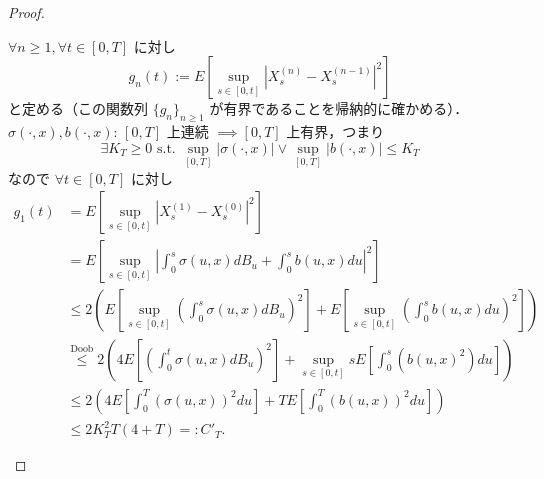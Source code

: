 \documentclass{jsarticle}
\begin{document}
\begin{proof}
\begin{enumerate}[label=(\roman*)]
        $\forall n\ge1, \forall t\in[0, T]$ に対し
        $$
        g_n(t)
        := E[\sup_{s\in[0, t]}\left\lvert X_s^{(n)}-X_s^{(n-1)}\right\rvert^2]
        $$
        と定める（この関数列 $\{g_n\}_{n\ge1}$ が有界であることを帰納的に確かめる）．
        $\sigma(\cdot, x), b(\cdot, x)$: $[0, T]$ 上連続 $\implies [0, T]$ 上有界，つまり
        $$
        \exists K_T\ge0\text{ s.t. }\sup_{[0, T]}\left\lvert \sigma(\cdot, x)\right\rvert\vee\sup_{[0, T]}\left\lvert b(\cdot, x)\right\rvert\le K_T
        $$
        なので $\forall t\in[0, T]$ に対し
        \begin{align}
            g_1(t)
            &= E[\sup_{s\in[0, t]}\left\lvert X_s^{(1)}-X_s^{(0)}\right\rvert^2] \\
            &= E[\sup_{s\in[0, t]}\left\lvert \int_0^s \sigma(u, x)dB_u
            + \int_0^s b(u, x)du\right\rvert^2] \\
            &\le 2(E[\sup_{s\in[0, t]}(\int_0^s \sigma(u, x)dB_u)^2]
            + E[\sup_{s\in[0, t]}(\int_0^s b(u, x)du)^2]) \\
            &\stackrel{\text{Doob}}{\le} 2(4E[(\int_0^t \sigma(u, x)dB_u)^2]
            + \sup_{s\in[0, t]}sE[\int_0^s (b(u, x)^2)du]) \\
            &\le 2(4E[\int_0^T (\sigma(u, x))^2du]
            + TE[\int_0^T (b(u, x))^2du]) \\
            &\le 2K_T^2T(4+T)=:C'_T.
        \end{align}


\end{enumerate}
\end{proof}
\end{document}
